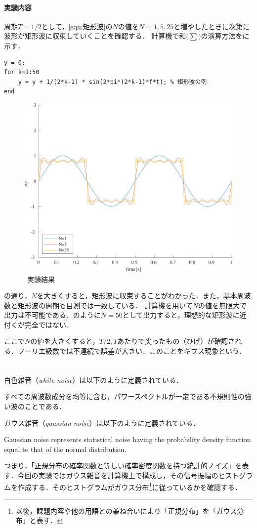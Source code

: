 \paragraph{実験内容}周期\(T=1/2\)として，\eqref{equ:矩形波}の\(N\)の値を\(N=1, 5, 25\)と増やしたときに次第に波形が矩形波に収束していくことを確認する．
計算機で和\(\big(\sum\big)\)の演算方法をに示す．
\begin{lstlisting}[caption={和の演算},label={src:和の演算},numbers={none}]
y = 0;
for k=1:50
    y = y + 1/(2*k-1) * sin(2*pi*(2*k-1)*f*t); % 矩形波の例
end
\end{lstlisting}
\result
\begin{figure}
    \centering
    \includegraphics[keepaspectratio,width=.3\textwidth]{../../Figures/01_04_2.pdf}
    \caption{\kadaiad\ 実験結果}
    \label{fig:\kadaiae_実験結果}
    \vspace{-1cm}
\end{figure}
の通り，\(N\)を大きくすると，矩形波に収束することがわかった．また，基本周波数と矩形波の周期も目測では一致している．
\consideration
計算機を用いて\(N\)の値を無限大で出力は不可能である．のように\(N=50\)として出力すると，理想的な矩形波に近付くが完全ではない．\par
ここで\(N\)の値を大きくすると，\(T/2, T\)あたりで尖ったもの（ひげ）が確認される．フーリエ級数では不連続で誤差が大きい．このことをギブス現象という．\cite[p.34]{信号処理}
\section{\kadaiae}\label{sec:\kadaiae}
\purpose
白色雑音（\textit{white noise}）は以下のように定義されている．
\begin{leftbar}
    すべての周波数成分を均等に含む，パワースペクトルが一定である不規則性の強い波のことである．
    \hfill\cite{witenoise}
\end{leftbar}
ガウス雑音（\textit{gaussian noise}）は以下のように定義されている．
\begin{leftbar}
    Gaussian noise represents statistical noise having the probability density function equal to that of the normal distribution.
    \hfill\cite{barbu2013variational}
\end{leftbar}
つまり，「正規分布の確率関数と等しい確率密度関数を持つ統計的ノイズ」を表す．今回の実験ではガウス雑音を計算機上で構成し，その信号振幅のヒストグラムを作成する．そのヒストグラムがガウス分布\footnote{以後，課題内容や他の用語との兼ね合いにより「正規分布」を「ガウス分布」と表す．}に従っているかを確認する．

